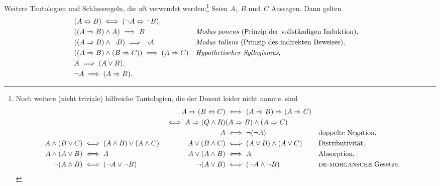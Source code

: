 \documentclass[a4paper]{article}
\begin{document}
\begin{theorem}\label{thm:logiclaws}
    Weitere Tautologien und Schlussregeln, die oft verwendet werden:\footnote{
        Noch weitere (nicht triviale) hilfreiche Tautologien, die der Dozent leider nicht nannte, sind
        \begin{align*}
                                &                                     & A \Rightarrow (B \Leftrightarrow C) & \iff (A \Rightarrow B) \Rightarrow (A \Rightarrow C)                                             \\
                                &                                     & \iff A \Rightarrow (Q \wedge R)     & (A \Rightarrow B) \wedge (A \Rightarrow C)                                                       \\
                                &                                     & A                                   & \iff \neg (\neg A)                                   &  & \text{doppelte Negation},              \\
            A \wedge (B \vee C) & \iff (A \wedge B) \vee (A \wedge C) & A \vee (B \wedge C)                 & \iff (A \vee B) \wedge (A \vee C)                    &  & \text{Distributivität},                \\
            A \wedge (A \vee B) & \iff A                              & A \vee (A \wedge B)                 & \iff A                                               &  & \text{Absorption},                     \\
            \neg (A \wedge B)   & \iff (\neg A \vee \neg B)           & \neg (A \vee B)                     & \iff (\neg A \wedge \neg B)                          &  & \text{\textsc{de-morgansche} Gesetze}. \\
        \end{align*}
    } Seien $A$,~$B$ und~$C$ Aussagen. Dann gelten
    \begin{align*}
         & (A \Leftrightarrow B) \iff (\neg A \Leftrightarrow \neg B),                                                                                    \\
         & ((A \Rightarrow B) \wedge A) \implies B                                 &  & \text{\emph{Modus ponens} (Prinzip der vollständigen Induktion),} \\
         & ((A \Rightarrow B) \wedge \neg B) \implies \neg A                       &  & \text{\emph{Modus tollens} (Prinzip des indirekten Beweises),}    \\
         & ((A \Rightarrow B) \wedge (B \Rightarrow C)) \implies (A \Rightarrow C) &  & \text{\emph{Hypothetischer Syllogismus},}                         \\
         & A \implies (A \vee B),                                                                                                                         \\
         & \neg A \implies (A \Rightarrow B).
    \end{align*}
\end{theorem}
\end{document}
